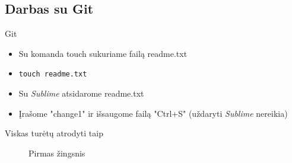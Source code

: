\documentclass[11pt,xcolor=table]{beamer}
\begin{document}
\subsection{Darbas su Git}

\begin{frame}[fragile]{Git}
\begin{itemize}
\item Su komanda touch sukuriame failą readme.txt
\item \colorbox{listinggray}{\lstinline|touch readme.txt|}
\item Su \textit{Sublime} atsidarome readme.txt
\item Įrašome "change1" ir išsaugome failą "Ctrl+S" (uždaryti \textit{Sublime} nereikia)
\end{itemize}
\end{frame}

\begin{frame}{Viskas turėtų atrodyti taip}
\begin{figure}
\caption{Pirmas žingsnis}
\end{figure}
\end{frame}



\end{document}
